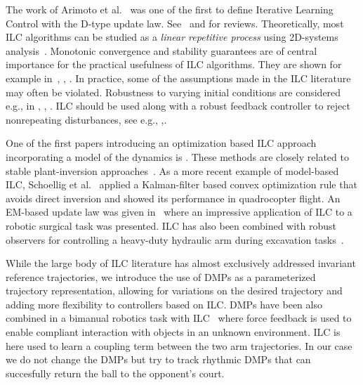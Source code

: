 
The work of Arimoto et al.~\cite{Arimoto84} was one of the first to define Iterative Learning Control with the D-type update law. See~\cite{Bristow06} and \cite{Moore07} for reviews. Theoretically, most ILC algorithms can be studied as a \emph{linear repetitive process} using 2D-systems analysis~\cite{Rogers07}. Monotonic convergence and stability guarantees are of central importance for the practical usefulness of ILC algorithms. They are shown for example in~\cite{Bristow06}, \cite{Norrloef02}, \cite{Longman2000}. In practice, some of the assumptions made in the ILC literature may often be violated. Robustness to varying initial conditions are considered e.g., in \cite{Hillenbrand00}, \cite{Park00}, \cite{Fang03}. ILC should be used along with a robust feedback controller to reject nonrepeating disturbances, see e.g., \cite{Chin04},\cite{Longman2000}. 

One of the first papers introducing an optimization based ILC approach incorporating a model of the dynamics is \cite{Amann95}. These methods are closely related to stable plant-inversion approaches~\cite{Ghosh99}. As a more recent example of model-based ILC, Schoellig et al.~\cite{Schoellig12} applied a Kalman-filter based convex optimization rule that avoids direct inversion and showed its performance in quadrocopter flight. An EM-based update law was given in~\cite{Berg10} where an impressive application of ILC to a robotic surgical task was presented. 
ILC has also been combined with robust observers for controlling a heavy-duty hydraulic arm during excavation tasks~\cite{Maeda2015Combined}. 

While the large body of ILC literature has almost exclusively addressed invariant reference trajectories, we introduce the use of DMPs as a parameterized trajectory representation, allowing for variations on the desired trajectory and adding more flexibility to controllers based on ILC. DMPs have been also combined in a bimanual robotics task with ILC~\cite{Gams13} where force feedback is used to enable compliant interaction with objects in an unknown environment. ILC is here used to learn a coupling term between the two arm trajectories. In our case we do not change the DMPs but try to track rhythmic DMPs that can succesfully return the ball to the opponent's court.


